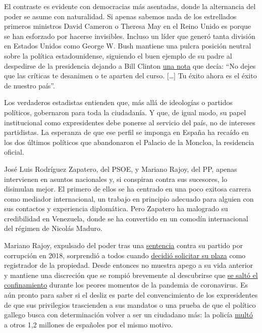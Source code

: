 El contraste es evidente con democracias más asentadas, donde la
alternancia del poder se asume con naturalidad. Si apenas sabemos nada
de los estrellados primeros ministros David Cameron o Theresa May en el
Reino Unido es porque se han esforzado por hacerse invisibles. Incluso
un líder que generó tanta división en Estados Unidos como George W. Bush
mantiene una pulcra posición neutral sobre la política estadounidense,
siguiendo el buen ejemplo de su padre al despedirse de la presidencia
dejando a Bill Clinton
\href{https://www.lavanguardia.com/economia/20200725/482489048270/seguridad-social-cita-previa-covid.html}{una
nota} que decía: ``No dejes que las críticas te desanimen o te aparten
del curso. {[}\ldots{}{]} Tu éxito ahora es el éxito de nuestro país''.

Los verdaderos estadistas entienden que, más allá de ideologías o
partidos políticos, gobernaron para toda la ciudadanía. Y que, de igual
modo, su papel institucional como expresidentes debe ponerse al servicio
del país, no de intereses partidistas. La esperanza de que ese perfil se
imponga en España ha recaído en los dos últimos políticos que
abandonaron el Palacio de la Moncloa, la residencia oficial.

José Luis Rodríguez Zapatero, del PSOE, y Mariano Rajoy, del PP, apenas
intervienen en asuntos nacionales y, si conspiran contra sus sucesores,
lo disimulan mejor. El primero de ellos se ha centrado en una poco
exitosa carrera como mediador internacional, un trabajo en principio
adecuado para alguien con sus contactos y experiencia diplomática. Pero
Zapatero ha malogrado su credibilidad en Venezuela, donde se ha
convertido en un comodín internacional del régimen de Nicolás Maduro.

Mariano Rajoy, expulsado del poder tras una
\href{https://www.nytimes3xbfgragh.onion/es/2018/05/24/espanol/partido-popular-corrupcion-rajoy-gurtel.html}{sentencia}
contra su partido por corrupción en 2018, sorprendió a todos cuando
\href{https://www.elconfidencial.com/espana/2018-10-22/mariano-rajoy-plaza-registro-mercantil-madrid_1633814/}{decidió
solicitar su plaza} como registrador de la propiedad. Desde entonces no
muestra apego a su vida anterior y mantiene una discreción que se rompió
brevemente al descubrirse que
\href{https://www.elconfidencial.com/espana/2020-04-29/policia-mariano-rajoy-ruptura-confinamiento_2573336/}{se
saltó el confinamiento} durante los peores momentos de la pandemia de
coronavirus. Es aún pronto para saber si el desliz es parte del
convencimiento de los expresidentes de que sus privilegios trascienden a
sus mandatos o una prueba de que el político gallego busca con
determinación volver a ser un ciudadano más: la policía
\href{https://www.laprovincia.es/espana/2020/06/20/alarma-cierra-1-millones-multas/1293308.html}{multó}
a otros 1,2 millones de españoles por el mismo motivo.

